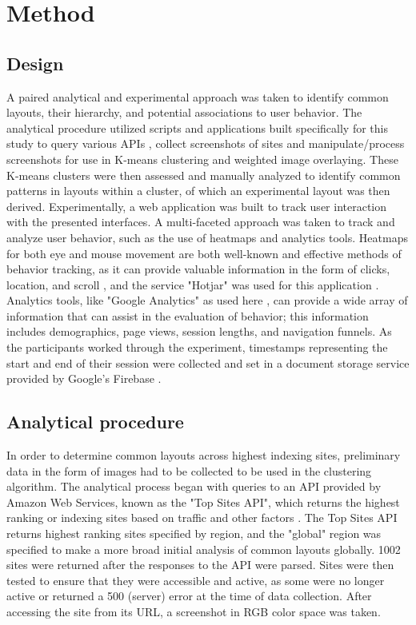 \documentclass[conference]{IEEEtran}
\begin{document}
\section{Method}

\subsection{Design}

A paired analytical and experimental approach was taken to identify common layouts, their hierarchy, and potential associations to user behavior. The analytical procedure utilized scripts and applications built specifically for this study to query various APIs \cite{antoniou_2015, deepai}, collect screenshots of sites and manipulate/process screenshots for use in K-means clustering and weighted image overlaying. These K-means clusters were then assessed and manually analyzed to identify common patterns in layouts within a cluster, of which an experimental layout was then derived. Experimentally, a web application was built to track user interaction with the presented interfaces. A multi-faceted approach was taken to track and analyze user behavior, such as the use of heatmaps and analytics tools. Heatmaps for both eye and mouse movement are both well-known and effective methods of behavior tracking, as it can provide valuable information in the form of clicks, location, and scroll \cite{mousetracking}, and the service "Hotjar" was used for this application \cite{hotjar}. Analytics tools, like "Google Analytics" as used here \cite{google_analytics}, can provide a wide array of information that can assist in the evaluation of behavior; this information includes demographics, page views, session lengths, and navigation funnels. As the participants worked through the experiment, timestamps representing the start and end of their session were collected and set in a document storage service provided by Google's Firebase \cite{google_firebase}.

\subsection{Analytical procedure}

In order to determine common layouts across highest indexing sites, preliminary data in the form of images had to be collected to be used in the clustering algorithm. The analytical process began with queries to an API provided by Amazon Web Services, known as the "Top Sites API", which returns the highest ranking or indexing sites based on traffic and other factors \cite{antoniou_2015}. The Top Sites API returns highest ranking sites specified by region, and the "global" region was specified to make a more broad initial analysis of common layouts globally. 1002 sites were returned after the responses to the API were parsed. Sites were then tested to ensure that they were accessible and active, as some were no longer active or returned a 500 (server) error at the time of data collection. After accessing the site from its URL, a screenshot in RGB color space was taken.
\end{document}
